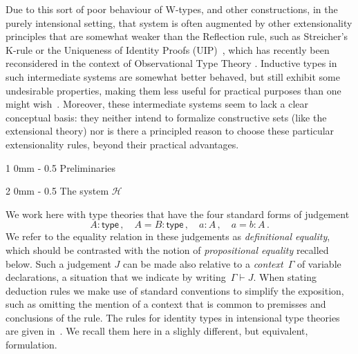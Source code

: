 \documentclass[reqno,10pt,a4paper,oneside]{amsart}
\makeatletter
\numberwithin{equation}{section}
\renewcommand{\section}{\@startsection
  {section}%
   {1}%
  {0mm}%
   {-\baselineskip}%
  {0.5\baselineskip}%
   {\Large\bfseries}}%
\renewcommand{\subsection}{\@startsection
  {subsection}%
  {2}%
  {0mm}%
  {-\baselineskip}%
  {0.5\baselineskip}%
  {\normalfont\normalsize\bf}}%
\theoremstyle{mythm}
\theoremstyle{mydef}
\theoremstyle{myrmk}
\newcommand{\Hint}{\mathcal{H}}
\newcommand{\type}{\mathsf{type}}
\makeatother
\begin{document}
Due to this sort of poor behaviour of W-types, and other constructions, in the purely intensional setting, that system is often augmented by other extensionality principles that are somewhat weaker than the Reflection rule, such as Streicher's K-rule  or the Uniqueness of Identity Proofs (UIP)~\cite{StreicherT:invitt}, which has recently been reconsidered
in the context of Observational Type Theory \cite{AltenkirchT:obsen}.  Inductive types in such intermediate systems are somewhat better behaved, but still exhibit some undesirable properties, making them less useful for practical purposes than one might wish~\cite{McBrideC:wtygnb}.  Moreover, these intermediate systems seem to lack a clear conceptual basis:  they neither intend to formalize constructive sets (like the extensional theory) nor is there a principled reason to choose these particular extensionality rules, beyond their practical advantages.  

\newpage

\section{Preliminaries}
\label{section:prelim}

\subsection{The system $\Hint$} 

We work here with type theories that have the four standard forms of judgement
\[
A : \type \, , \quad A = B : \type \, , \quad   a : A \, , \quad a = b : A \, . 
\]
We refer to the equality relation in these judgements as \emph{definitional equality}, 
which should be contrasted with the notion of \emph{propositional equality}
recalled below. 
Such a judgement $J$ can be made also relative to a \emph{context}~$\Gamma$ of variable declarations, a situation that we indicate by writing~$\Gamma \vdash J$. When stating deduction
rules we make use of standard conventions to simplify the exposition, such as omitting the mention
of a context that is common to premisses and conclusions of the rule.
The rules for identity types in intensional type theories are given in~\cite[Section~5.5]{NordstromB:marltt}. We recall them here in a slighly different, but equivalent, formulation.
\end{document}
